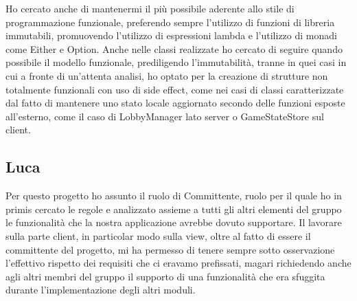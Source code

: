 Ho cercato anche di mantenermi il più possibile aderente allo stile di programmazione funzionale, preferendo sempre l’utilizzo di funzioni di libreria immutabili, promuovendo l’utilizzo di espressioni lambda e l’utilizzo di monadi come Either e Option.
Anche nelle classi realizzate ho cercato di seguire quando possibile il modello funzionale, prediligendo l’immutabilità, tranne in quei casi in cui a fronte di un’attenta analisi, ho optato per la creazione di strutture non totalmente funzionali con uso di side effect, come nei casi di classi caratterizzate dal fatto di mantenere uno stato locale aggiornato secondo delle funzioni esposte all’esterno, come il caso di LobbyManager lato server o GameStateStore sul client.

\subsection{Luca}
Per questo progetto ho assunto il ruolo di Committente, ruolo per il quale ho in primis cercato le regole e analizzato assieme a tutti gli altri elementi del gruppo le funzionalità che la nostra applicazione avrebbe dovuto supportare. \newline \newline Il lavorare sulla parte client, in particolar modo sulla view, oltre al fatto di essere il committente del progetto, mi ha permesso di tenere sempre sotto osservazione l’effettivo rispetto dei requisiti che ci eravamo prefissati, magari richiedendo anche agli altri membri del gruppo il supporto di una funzionalità che era sfuggita durante l’implementazione degli altri moduli.
